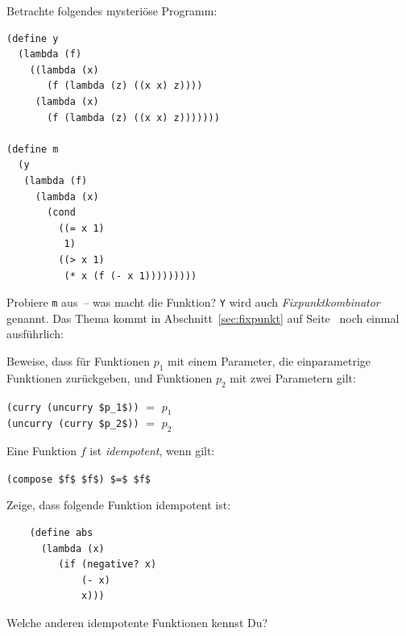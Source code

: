 \begin{aufgabe}
  Betrachte folgendes mysteriöse Programm:
  \begin{lstlisting}
(define y
  (lambda (f)
    ((lambda (x)
       (f (lambda (z) ((x x) z))))
     (lambda (x)
       (f (lambda (z) ((x x) z)))))))

(define m
  (y
   (lambda (f)
     (lambda (x)
       (cond
         ((= x 1)
          1)
         ((> x 1)
          (* x (f (- x 1)))))))))
   \end{lstlisting}
  Probiere \lstinline{m} aus~-- was macht die Funktion?  \lstinline{Y}
  wird auch \textit{Fixpunktkombinator}
  genannt.  Das Thema kommt in Abschnitt~\ref{sec:fixpunkt} auf
  Seite~\pageref{sec:fixpunkt} noch einmal ausführlich:
 \end{aufgabe}

\begin{aufgabe}
  Beweise, dass für Funktionen $p_1$ mit einem Parameter, die
  einparametrige Funktionen zurückgeben, und Funktionen $p_2$ mit zwei
  Parametern gilt:
  \begin{center}
    \lstinline{(curry (uncurry $p_1$))} $=$ $p_1$\\
    \lstinline{(uncurry (curry $p_2$))} $=$ $p_2$
  \end{center}
 \end{aufgabe}

\begin{aufgabe}
  Eine Funktion $f$ ist \textit{idempotent}, wenn gilt:

  \begin{center}
    \lstinline{(compose $f$ $f$) $=$ $f$}
  \end{center}

  Zeige, dass folgende Funktion idempotent ist:

  \begin{lstlisting}
    (define abs
      (lambda (x)
         (if (negative? x)
             (- x)
             x)))  \end{lstlisting}

  Welche anderen idempotente Funktionen kennst Du?
\end{aufgabe}

